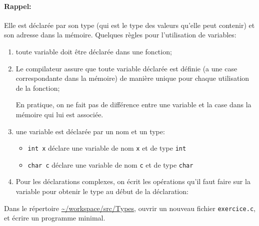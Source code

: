 \prerequis{}

\paragraph{Rappel:} Elle est déclarée par son type (qui est le type des
valeurs qu'elle peut contenir) et son adresse dans la mémoire. 
Quelques règles pour l'utilisation de variables:
\begin{enumerate}
\item toute variable doit être déclarée dans une fonction;
\item Le compilateur assure que toute variable déclarée est définie (a
  une case correspondante dans la mémoire) de manière unique pour
  chaque utilisation de la fonction;
  \begin{fminipage}{0.9\textwidth}
    En pratique, on ne fait pas de différence entre une variable et la
    case dans la mémoire qui lui est associée.
  \end{fminipage}
\item une variable est déclarée par un nom et un type:
  \begin{exemple}
    \begin{itemize}
    \item \texttt{int x} déclare une variable de nom \texttt{x} et de
      type \texttt{int}
    \item \texttt{char c} déclare une variable de nom \texttt{c} et de
      type \texttt{char}
    \end{itemize}
  \end{exemple}
\item Pour les déclarations complexes, on écrit les opérations qu'il
  faut faire sur la variable pour obtenir le type au début de la
  déclaration:
\end{enumerate}

\question Dans le répertoire \url{~/workspace/src/Types}, ouvrir un
nouveau fichier \texttt{exercice.c}, et écrire un
programme minimal.

